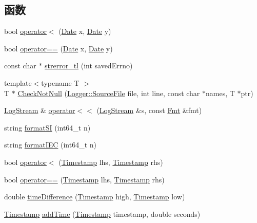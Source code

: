 \subsection*{函数}
\begin{DoxyCompactItemize}
\item 
bool \hyperlink{namespacemuduo_a16d6a8ea1b5e79c94c59f96137b8d26d}{operator$<$} (\hyperlink{classmuduo_1_1Date}{Date} x, \hyperlink{classmuduo_1_1Date}{Date} y)
\item 
bool \hyperlink{namespacemuduo_a0a048e90c15864ab82a55b148bebd144}{operator==} (\hyperlink{classmuduo_1_1Date}{Date} x, \hyperlink{classmuduo_1_1Date}{Date} y)
\item 
const char $\ast$ \hyperlink{namespacemuduo_a8c7278edf83f347bacf79e36689bf91c}{strerror\+\_\+tl} (int saved\+Errno)
\item 
{\footnotesize template$<$typename T $>$ }\\T $\ast$ \hyperlink{namespacemuduo_a4b813c501ed67387236a1291d1873ab5}{Check\+Not\+Null} (\hyperlink{classmuduo_1_1Logger_1_1SourceFile}{Logger\+::\+Source\+File} file, int line, const char $\ast$names, T $\ast$ptr)
\item 
\hyperlink{classmuduo_1_1LogStream}{Log\+Stream} \& \hyperlink{namespacemuduo_a8306fbe1f821ddb82e4c161f936695b2}{operator$<$$<$} (\hyperlink{classmuduo_1_1LogStream}{Log\+Stream} \&s, const \hyperlink{classmuduo_1_1Fmt}{Fmt} \&fmt)
\item 
string \hyperlink{namespacemuduo_a2530c171cac6dda7399a9eb5805e01fa}{format\+SI} (int64\+\_\+t n)
\item 
string \hyperlink{namespacemuduo_a2ad8a8650556c05bae4c4f449ac6d106}{format\+I\+EC} (int64\+\_\+t n)
\item 
bool \hyperlink{namespacemuduo_a7cdae651f87c159c785591256d06740e}{operator$<$} (\hyperlink{classmuduo_1_1Timestamp}{Timestamp} lhs, \hyperlink{classmuduo_1_1Timestamp}{Timestamp} rhs)
\item 
bool \hyperlink{namespacemuduo_abf794c2f7edbea7af7ae48632eef1b84}{operator==} (\hyperlink{classmuduo_1_1Timestamp}{Timestamp} lhs, \hyperlink{classmuduo_1_1Timestamp}{Timestamp} rhs)
\item 
double \hyperlink{namespacemuduo_a6f7c17d86f2474f297b3b9e54b500907}{time\+Difference} (\hyperlink{classmuduo_1_1Timestamp}{Timestamp} high, \hyperlink{classmuduo_1_1Timestamp}{Timestamp} low)
\item 
\hyperlink{classmuduo_1_1Timestamp}{Timestamp} \hyperlink{namespacemuduo_a4c4a0e85f7b5c4056878cd7cf26a83cb}{add\+Time} (\hyperlink{classmuduo_1_1Timestamp}{Timestamp} timestamp, double seconds)

\end{DoxyCompactItemize}
